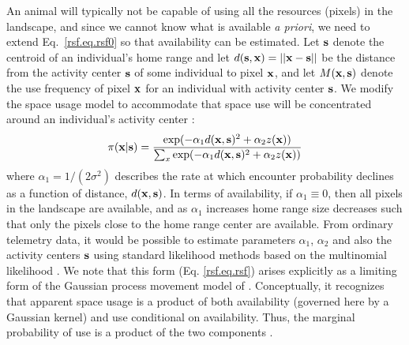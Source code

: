 \documentclass[12pt]{article}
\begin{document}
An animal will typically not be capable of using all the
resources (pixels) in the landscape, and since we cannot know what is
available \textit{a priori}, we need to extend
Eq.~\ref{rsf.eq.rsf0} so that availability can be estimated.
Let ${\bf s}$ denote the
centroid of an individual's home range and let $d({\bf s},{\bf x}) =
||{\bf x} - {\bf s}||$ be the distance from the activity center
${\bf s}$ of some individual to pixel ${\bf x}$, and let $M({\bf
  x},{\bf s})$ denote the use frequency of pixel ${\bf x}$ for an
individual with activity center ${\bf s}$.  We modify the space usage
model to accommodate that space use will be concentrated around an
individual's activity center
\citep{johnson_etal:2008,forester_etal:2009}:
\begin{equation}
 \pi({\bf x}|{\bf s})  = \frac{ \exp( -\alpha_{1} d({\bf x},{\bf s})^{2} +\alpha_{2} z({\bf x}) )}
{ \sum_{x} \exp(-\alpha_{1} d({\bf x},{\bf s})^{2} +\alpha_{2} z({\bf x}))}
\label{rsf.eq.rsf}
\end{equation}
where $\alpha_1=1/(2\sigma^2)$ describes the rate at which encounter
probability declines as a function of distance, $d({\bf x},{\bf
  s})$. In terms of availability, if $\alpha_1 \equiv 0$, then all
pixels in the landscape are available, and as $\alpha_1$ increases
home range size decreases such that only the pixels close to the home
range center are available.
From ordinary telemetry data, it would be possible to estimate
parameters $\alpha_{1}$, $\alpha_{2}$ and also the activity centers
${\bf s}$ using standard likelihood methods based on the multinomial
likelihood \citep{johnson_etal:2008}.  We note that this form
(Eq. \ref{rsf.eq.rsf}) arises explicitly as a limiting form of the
Gaussian process movement model of
\citet{johnson_etal:2008}. Conceptually, it recognizes that apparent
space usage is a product of both availability (governed here by a
Gaussian kernel) and use conditional on availability. Thus, the
marginal probability of use is a product of the two components
\citep{johnson_etal:2008, forester_etal:2009}.
\end{document}
